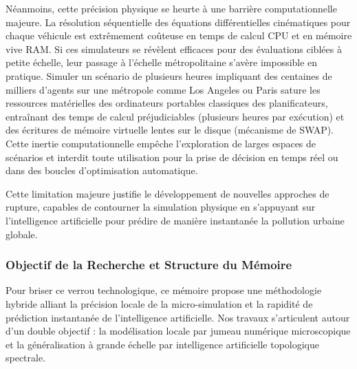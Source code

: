\documentclass[10pt, a4paper]{article}
\begin{document}
Néanmoins, cette précision physique se heurte à une barrière
computationnelle majeure. La résolution séquentielle des équations
différentielles cinématiques pour chaque véhicule est extrêmement
coûteuse en temps de calcul CPU et en mémoire vive RAM. Si ces
simulateurs se révèlent efficaces pour des évaluations ciblées à petite
échelle, leur passage à l'échelle métropolitaine s'avère impossible en
pratique. Simuler un scénario de plusieurs heures impliquant des
centaines de milliers d'agents sur une métropole comme Los Angeles ou
Paris sature les ressources matérielles des ordinateurs portables
classiques des planificateurs, entraînant des temps de calcul
préjudiciables (plusieurs heures par exécution) et des écritures de
mémoire virtuelle lentes sur le disque (mécanisme de SWAP). Cette
inertie computationnelle empêche l'exploration de larges espaces de
scénarios et interdit toute utilisation pour la prise de décision en
temps réel ou dans des boucles d'optimisation automatique.

Cette limitation majeure justifie le développement de nouvelles
approches de rupture, capables de contourner la simulation physique en
s'appuyant sur l'intelligence artificielle pour prédire de manière
instantanée la pollution urbaine globale.

\subsubsection{Objectif de la Recherche et Structure du
Mémoire}\label{objectif-de-la-recherche-et-structure-du-muxe9moire}

Pour briser ce verrou technologique, ce mémoire propose une méthodologie
hybride alliant la précision locale de la micro-simulation et la
rapidité de prédiction instantanée de l'intelligence artificielle. Nos
travaux s'articulent autour d'un double objectif : la modélisation
locale par jumeau numérique microscopique et la généralisation à grande
échelle par intelligence artificielle topologique spectrale.
\end{document}
